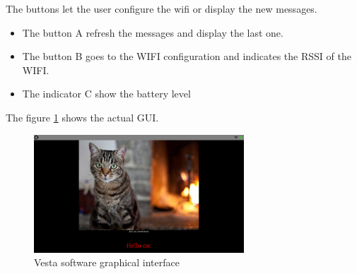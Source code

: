The buttons let the user configure the wifi or display the new messages.

\begin{itemize}
\item{The button A refresh the messages and display the last one.}
\item{The button B goes to the WIFI configuration and indicates the RSSI of the WIFI.}
\item{The indicator C show the battery level}
\end{itemize}

The figure \ref{fig:graphical interface} shows the actual GUI.

\begin{figure}[!htb]
    \centering
    \includegraphics[width=0.7\textwidth,keepaspectratio]{chap/softFig/vesta_printscreen}
    \caption{Vesta software graphical interface}
    \label{fig:graphical interface}
\end{figure}


